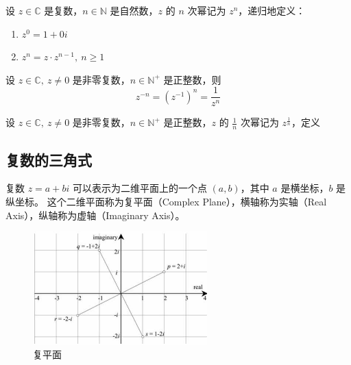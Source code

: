 \begin{definition}[复数的自然数次幂]
    设 $z\in\mathbb{C}$ 是复数，$n\in\mathbb{N}$ 是自然数，$z$ 的 $n$ 次幂记为 $z^n$，递归地定义：
    \begin{enumerate}
        \item $z^0 = 1 + 0i$
        \item $z^n = z \cdot z^{n-1},\ n\ge 1$
    \end{enumerate}
\end{definition}

\begin{definition}[复数的负整数次幂]
    设 $z\in\mathbb{C},\ z\neq 0$ 是非零复数，$n\in\mathbb{N}^+$ 是正整数，则
    \[
        z^{-n} = (z^{-1})^n = \frac{1}{z^n}
    \]
\end{definition}

\begin{definition}[复数的有理数次幂]
    设 $z\in\mathbb{C},\ z\neq 0$ 是非零复数，$n\in\mathbb{N}^+$ 是正整数，$z$ 的 $\frac{1}{n}$ 次幂记为 $z^{\frac{1}{n}}$，定义
\end{definition}


\vspace{1em}
\subsection{复数的三角式}

复数 $z=a+bi$ 可以表示为二维平面上的一个点 $(a,b)$，其中 $a$ 是横坐标，$b$ 是纵坐标。
这个二维平面称为复平面（Complex Plane），横轴称为实轴（Real Axis），纵轴称为虚轴（Imaginary Axis）。

\begin{figure}[htbp]
    \centering
    \includegraphics[width=0.6\textwidth]{figures/chapter3/ArgandDiagram.png} 
    \caption{复平面}
    \label{fig:ArgandDiagram}
\end{figure}
\vspace{1em}

